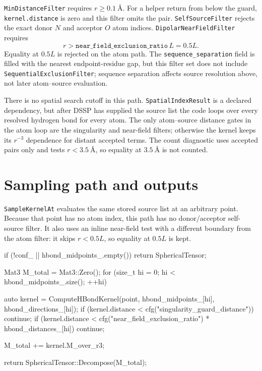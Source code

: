 \documentclass[11pt]{article}
\newcommand{\code}[1]{\texttt{#1}}
\begin{document}
\code{MinDistanceFilter} requires \(r\ge\SI{0.1}{\angstrom}\). For a helper
return from below the guard, \code{kernel.distance} is zero and this filter
omits the pair. \code{SelfSourceFilter} rejects the exact donor \(N\) and
acceptor \(O\) atom indices. \code{DipolarNearFieldFilter} requires
\[
  r > \code{near\_field\_exclusion\_ratio}\,L = 0.5L .
\]
Equality at \(0.5L\) is rejected on the atom path. The
\code{sequence\_separation} field is filled with the nearest endpoint-residue
gap, but this filter set does not include \code{SequentialExclusionFilter};
sequence separation affects source resolution above, not later atom--source
evaluation.

There is no spatial search cutoff in this path. \code{SpatialIndexResult} is a
declared dependency, but after DSSP has supplied the source list the code loops
over every resolved hydrogen bond for every atom. The only atom--source
distance gates in the atom loop are the singularity and near-field filters;
otherwise the kernel keeps its \(r^{-3}\) dependence for distant accepted
terms. The count diagnostic
uses accepted pairs only and tests \(r<\SI{3.5}{\angstrom}\), so equality at
\(\SI{3.5}{\angstrom}\) is not counted.

\section{Sampling path and outputs}

\code{SampleKernelAt} evaluates the same stored source list at an arbitrary
point. Because that point has no atom index, this path has no donor/acceptor
self-source filter. It also uses an inline near-field test with a different
boundary from the atom filter: it skips \(r<0.5L\), so equality at \(0.5L\) is
kept.

\begin{codebox}
if (!conf_ || hbond_midpoints_.empty()) return SphericalTensor{};

Mat3 M_total = Mat3::Zero();
for (size_t hi = 0; hi < hbond_midpoints_.size(); ++hi) {
    auto kernel = ComputeHBondKernel(point, hbond_midpoints_[hi],
                                     hbond_directions_[hi]);
    if (kernel.distance < cfg("singularity_guard_distance")) continue;
    if (kernel.distance < cfg("near_field_exclusion_ratio") *
                          hbond_distances_[hi]) continue;

    M_total += kernel.M_over_r3;
}
return SphericalTensor::Decompose(M_total);
\end{codebox}
\end{document}
